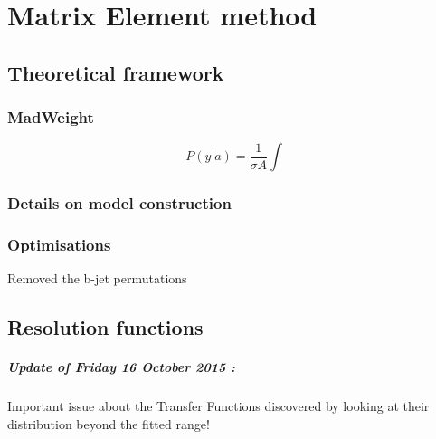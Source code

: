 \chapter{Matrix Element method} \label{ch::MW}

\section{Theoretical framework} \label{sec::MWTheory}
\subsection{MadWeight}

\begin{equation} \label{eq::MWEvtProb}
 P(y \vert a) = \frac{1}{\sigma A} \int
\end{equation}


\subsection{Details on model construction}

\subsection{Optimisations}

Removed the b-jet permutations

\section{Resolution functions} \label{sec::TF}

\paragraph{Update of Friday 16 October 2015 :} 
Important issue about the Transfer Functions discovered by looking at their distribution beyond the fitted range!
\\

